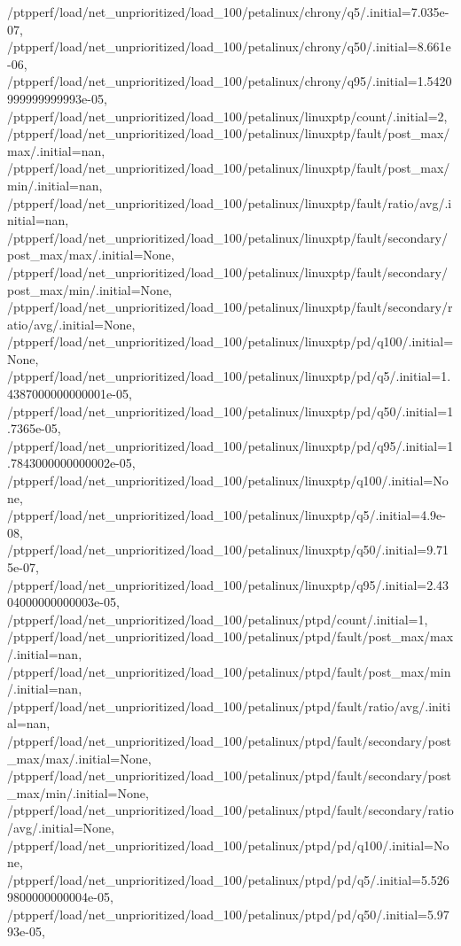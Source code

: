 {    /ptpperf/load/net_unprioritized/load_100/petalinux/chrony/q5/.initial=7.035e-07,
    /ptpperf/load/net_unprioritized/load_100/petalinux/chrony/q50/.initial=8.661e-06,
    /ptpperf/load/net_unprioritized/load_100/petalinux/chrony/q95/.initial=1.5420999999999993e-05,
    /ptpperf/load/net_unprioritized/load_100/petalinux/linuxptp/count/.initial=2,
    /ptpperf/load/net_unprioritized/load_100/petalinux/linuxptp/fault/post_max/max/.initial=nan,
    /ptpperf/load/net_unprioritized/load_100/petalinux/linuxptp/fault/post_max/min/.initial=nan,
    /ptpperf/load/net_unprioritized/load_100/petalinux/linuxptp/fault/ratio/avg/.initial=nan,
    /ptpperf/load/net_unprioritized/load_100/petalinux/linuxptp/fault/secondary/post_max/max/.initial=None,
    /ptpperf/load/net_unprioritized/load_100/petalinux/linuxptp/fault/secondary/post_max/min/.initial=None,
    /ptpperf/load/net_unprioritized/load_100/petalinux/linuxptp/fault/secondary/ratio/avg/.initial=None,
    /ptpperf/load/net_unprioritized/load_100/petalinux/linuxptp/pd/q100/.initial=None,
    /ptpperf/load/net_unprioritized/load_100/petalinux/linuxptp/pd/q5/.initial=1.4387000000000001e-05,
    /ptpperf/load/net_unprioritized/load_100/petalinux/linuxptp/pd/q50/.initial=1.7365e-05,
    /ptpperf/load/net_unprioritized/load_100/petalinux/linuxptp/pd/q95/.initial=1.7843000000000002e-05,
    /ptpperf/load/net_unprioritized/load_100/petalinux/linuxptp/q100/.initial=None,
    /ptpperf/load/net_unprioritized/load_100/petalinux/linuxptp/q5/.initial=4.9e-08,
    /ptpperf/load/net_unprioritized/load_100/petalinux/linuxptp/q50/.initial=9.715e-07,
    /ptpperf/load/net_unprioritized/load_100/petalinux/linuxptp/q95/.initial=2.4304000000000003e-05,
    /ptpperf/load/net_unprioritized/load_100/petalinux/ptpd/count/.initial=1,
    /ptpperf/load/net_unprioritized/load_100/petalinux/ptpd/fault/post_max/max/.initial=nan,
    /ptpperf/load/net_unprioritized/load_100/petalinux/ptpd/fault/post_max/min/.initial=nan,
    /ptpperf/load/net_unprioritized/load_100/petalinux/ptpd/fault/ratio/avg/.initial=nan,
    /ptpperf/load/net_unprioritized/load_100/petalinux/ptpd/fault/secondary/post_max/max/.initial=None,
    /ptpperf/load/net_unprioritized/load_100/petalinux/ptpd/fault/secondary/post_max/min/.initial=None,
    /ptpperf/load/net_unprioritized/load_100/petalinux/ptpd/fault/secondary/ratio/avg/.initial=None,
    /ptpperf/load/net_unprioritized/load_100/petalinux/ptpd/pd/q100/.initial=None,
    /ptpperf/load/net_unprioritized/load_100/petalinux/ptpd/pd/q5/.initial=5.5269800000000004e-05,
    /ptpperf/load/net_unprioritized/load_100/petalinux/ptpd/pd/q50/.initial=5.9793e-05,
}
